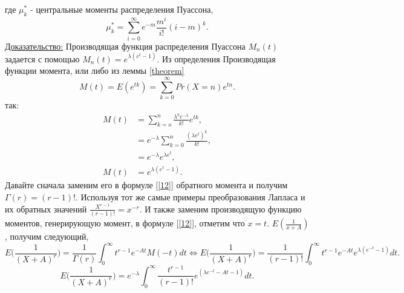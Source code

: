 \documentclass[13pt]{article}
\begin{document}
где $\mu_{k}^{*}$ - центральные моменты распределения Пуассона,
\[
\mu_{k}^{*} = \sum_{i = 0 }^{\infty}e^{-m}\frac{m^{i}}{i!}(i-m)^k.
\]
\underline{Доказательство:}
Производящая функция распределения Пуассона $M_{n}(t)$ задается с помощью $M_{n}(t)=e^{\lambda(e^{t}-1)}$. Из определения Производящая функции момента, или либо из леммы \ref{theorem}
\[
M(t) = E(e^{tk}) = \sum_{k=0}^{\infty}Pr(X = n)e^{tn}.
\]
так:
\begin{align*}
    M(t)&= \sum_{k=o}^{n}\frac{\lambda^{k}e^{-\lambda}}{k!}e^{tk}, \\
        &= e^{-\lambda}\sum_{k=0}^{n}\frac{(\lambda e^{t})^{k}}{k!}, \\
        &= e^{-\lambda}e^{\lambda e^{t}} ,\\
    M(t) &= e^{\lambda (e^{t}-1)}.
\end{align*}
Давайте сначала заменим его в формуле [\ref{12}] обратного момента и получим $\Gamma(r)=(r-1)!$. Используя тот же самые примеры преобразования Лапласа и
их обратных значений $\frac{X^{r-1}}{(r-1)!}=x^{-r}$. И также  заменим производящую функцию моментов, генерирующую момент, в формуле [\ref{12}], отметим что $x=t$. $E(\frac{1}{x+A})$, получим следующий, 
\[
 E\Big(\frac{1}{(X+A)^{r}}\Big) = \frac{1}{\Gamma(r)}\int_{0}^{\infty}t^{r-1}e^{-At}M(-t)dt 
 \Longleftrightarrow 
 E\Big(\frac{1}{(X+A)^{r}}\Big) = \frac{1}{(r -1)!}\int_{0}^{\infty} t^{r-1}e^{-At}e^{\lambda (e^{-t}-1)}dt.
\]
\begin{equation}\label{eq:20}
    E\Big(\frac{1}{(X+A)^{r}}\Big) = e^{-\lambda} \int_{0}^{\infty}\frac{ t^{r-1}}{(r -1)!}e^{(\lambda e^{-t}-At-1)}dt.
\end{equation}
\end{document}
